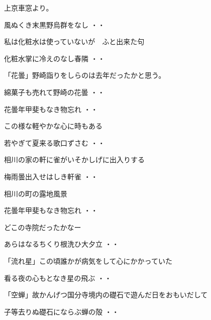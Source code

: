 \vspace{0.6cm}
上京車窓より。
\begin{shiika}風ぬくき末黒野烏群をなし
\hfill{・・}\end{shiika}
\vspace{0.6cm}
私は化粧水は使っていないが　ふと出来た句
\begin{shiika}化粧水掌に冷えのなし春隣
\hfill{・・}\end{shiika}
\vspace{0.6cm}
「花曇」野崎詣りをしらのは去年だったかと思う。
\begin{shiika}綿菓子も売れて野崎の花曇
\hfill{・・}\end{shiika}
\begin{shiika}花曇年甲斐もなき物忘れ
\hfill{・・}\end{shiika}
\vspace{0.6cm}
この様な軽やかな心に時もある
\begin{shiika}若やぎて夏来る歌口ずさむ
\hfill{・・}\end{shiika}
\vspace{0.6cm}
相川の家の軒に雀がいそかしげに出入りする
\begin{shiika}梅雨曇出入せはしき軒雀
\hfill{・・}\end{shiika}
\vspace{0.6cm}
相川の町の露地風景
\begin{shiika}花曇年甲斐もなき物忘れ
\hfill{・・}\end{shiika}
\vspace{0.6cm}
どこの寺院だったかなー
\begin{shiika}あらはなるちくり根洗ひ大夕立
\hfill{・・}\end{shiika}
\vspace{0.6cm}
「流れ星」この頃誰かが病気をして心にかかっていた
\begin{shiika}看る夜の心もとなき星の飛ぶ
\hfill{・・}\end{shiika}
\vspace{0.6cm}
「空蝉」故かんげつ国分寺境内の礎石で遊んだ日をおもいだして
\begin{shiika}子等去りぬ礎石にならぶ蝉の殻
\hfill{・・}\end{shiika}
